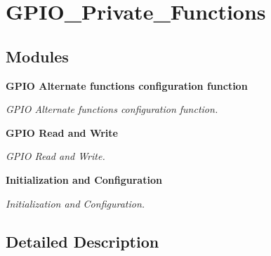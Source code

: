 \section{G\+P\+I\+O\+\_\+\+Private\+\_\+\+Functions}
\label{group__GPIO__Private__Functions}
\subsection*{Modules}
\begin{DoxyCompactItemize}
\item 
\textbf{ G\+P\+I\+O Alternate functions configuration function}
\begin{DoxyCompactList}\small\item\em G\+P\+IO Alternate functions configuration function. \end{DoxyCompactList}\item 
\textbf{ G\+P\+I\+O Read and Write}
\begin{DoxyCompactList}\small\item\em G\+P\+IO Read and Write. \end{DoxyCompactList}\item 
\textbf{ Initialization and Configuration}
\begin{DoxyCompactList}\small\item\em Initialization and Configuration. \end{DoxyCompactList}\end{DoxyCompactItemize}


\subsection{Detailed Description}
